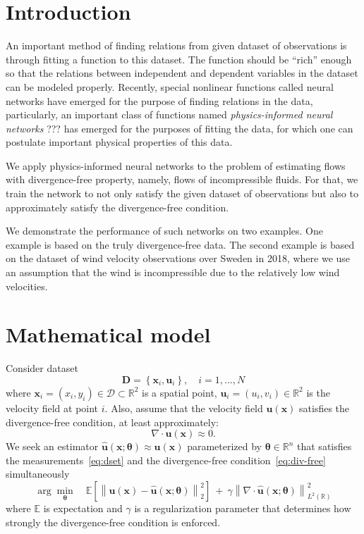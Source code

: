 \documentclass[pamm,a4paper,fleqn]{w-art}
\renewcommand{\vec}[1]{\boldsymbol{#1}}
\newcommand{\R}{\mathbb R}
\newcommand{\norm}[1]{\left\lVert#1\right\rVert}
\begin{document}
\section{Introduction}

An important method of finding relations from given dataset of observations
is through fitting a function to this dataset.
The function should be ``rich'' enough so that the relations between independent
and dependent variables in the dataset can be modeled properly.
Recently, special nonlinear functions called neural networks have emerged for
the purpose of finding relations in the data, particularly, an important class
of functions named \emph{physics-informed neural networks} ??? has emerged for
the purposes of fitting the data, for which one can postulate important physical
properties of this data.

We apply physics-informed neural networks to the problem of estimating flows
with divergence-free property, namely, flows of incompressible fluids.
For that, we train the network to not only satisfy the given dataset of
observations but also to approximately satisfy the divergence-free condition.

We demonstrate the performance of such networks on two examples.
One example is based on the truly divergence-free data.
The second example is based on the dataset of wind velocity observations over
Sweden in 2018, where we use an assumption that the wind is incompressible due
to the relatively low wind velocities.

\section{Mathematical model}
Consider dataset
\begin{equation}
  \label{eq:dset}
  \vec{D} = \left\{\vec{x}_i, \vec{u}_i\right\}, \quad i = 1, \dots, N
\end{equation}
where $\vec{x}_i = (x_i, y_i) \in \mathcal D \subset \R^2$ is a spatial point,
$\vec{u}_i = (u_i, v_i) \in \R^2$ is the velocity field at point $i$.
Also, assume that the velocity field $\vec u (\vec x)$ satisfies the
divergence-free condition, at least approximately:
\begin{equation}
  \label{eq:div-free}
  \nabla \cdot \vec u (\vec x) \approx 0.
\end{equation}
We seek an estimator $\hat{\vec u} (\vec x; \vec \theta)\approx \vec u(\vec x)$
parameterized by $\vec \theta \in \R^n$ that satisfies
the measurements~\eqref{eq:dset} and the divergence-free
condition~\eqref{eq:div-free} simultaneously
\begin{equation}
  \arg \min_{\vec \theta} \quad 
  \mathbb E \left[
    \norm{\vec u(\vec x) - \hat{\vec u}(\vec x; \vec{\theta})}^2_2
  \right] \ + \ 
  \gamma \norm{\nabla \cdot \hat{\vec u}(\vec x; \vec{\theta})}^2_{L^2(\R)} 
\end{equation}
where $\mathbb E$ is expectation
and $\gamma$ is a regularization parameter that determines how strongly
the divergence-free condition is enforced.
\end{document}
